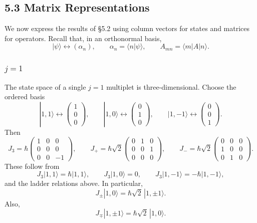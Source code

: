 \documentclass[11pt,a4paper]{article}
\begin{document}
\subsection*{5.3 Matrix Representations}

We now express the results of \S5.2 using column vectors for states
and matrices for operators. Recall that, in an orthonormal basis,
\[
    |\psi\rangle\longleftrightarrow(\alpha_n),
    \qquad \alpha_n=\langle n|\psi\rangle,
    \qquad A_{mn}=\langle m|A|n\rangle.
\]

\subsubsection*{$j=1$}

The state space of a single $j=1$ multiplet is three-dimensional.
Choose the ordered basis
\[
    |1,1\rangle\longleftrightarrow
       \begin{pmatrix}1\\0\\0\end{pmatrix},\qquad
    |1,0\rangle\longleftrightarrow
       \begin{pmatrix}0\\1\\0\end{pmatrix},\qquad
    |1,-1\rangle\longleftrightarrow
       \begin{pmatrix}0\\0\\1\end{pmatrix}.
\]
Then
\[
    J_3=\hbar\begin{pmatrix}1&0&0\\0&0&0\\0&0&-1\end{pmatrix},
    \qquad
    J_+=\hbar\sqrt2
        \begin{pmatrix}0&1&0\\0&0&1\\0&0&0\end{pmatrix},
    \qquad
    J_-=\hbar\sqrt2
        \begin{pmatrix}0&0&0\\1&0&0\\0&1&0\end{pmatrix}.
\]
These follow from
\[
    J_3|1,1\rangle=\hbar|1,1\rangle,\qquad
    J_3|1,0\rangle=0,\qquad
    J_3|1,-1\rangle=-\hbar|1,-1\rangle,
\]
and the ladder relations above. In particular,
\[
    J_\pm|1,0\rangle=\hbar\sqrt2\,|1,\pm1\rangle.
\]
Also,
\[
    J_\mp|1,\pm1\rangle=\hbar\sqrt2\,|1,0\rangle.
\]
\end{document}
